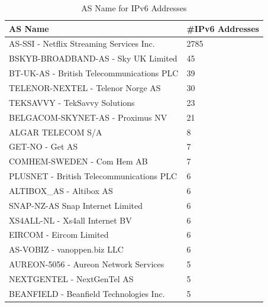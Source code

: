 \begin{table}[!h]
	\centering
	\caption{AS Name for IPv6 Addresses}
	\label{table:asnipv6}
	\begin{tabular}{lp{3cm}}
  		\toprule
  		\textbf{AS Name} & \textbf{\#IPv6 Addresses} \\ 
  		\midrule
		AS-SSI - Netflix Streaming Services Inc.                       &                 2785  \\
		BSKYB-BROADBAND-AS - Sky UK Limited                           &                    45  \\
		BT-UK-AS - British Telecommunications PLC                     &                    39  \\
		TELENOR-NEXTEL - Telenor Norge AS                              &                   30  \\
		TEKSAVVY - TekSavvy Solutions                             &                        23  \\
		BELGACOM-SKYNET-AS - Proximus NV                        &                          21  \\
		ALGAR TELECOM S/A                                       &                           8  \\
		GET-NO - Get AS                                        &                            7  \\
		COMHEM-SWEDEN - Com Hem AB                             &                            7  \\
		PLUSNET - British Telecommunications PLC                  &                         6  \\
		ALTIBOX\_AS - Altibox AS                                &                            6 \\
		SNAP-NZ-AS Snap Internet Limited                         &                          6  \\
		XS4ALL-NL - Xs4all Internet BV                          &                           6  \\
		EIRCOM - Eircom Limited                                 &                           6  \\
		AS-VOBIZ - vanoppen.biz LLC                             &                           6  \\
		AUREON-5056 - Aureon Network Services                   &                           5  \\
		NEXTGENTEL - NextGenTel AS                               &                          5  \\
		BEANFIELD - Beanfield Technologies Inc.                  &                          5  \\

\end{tabular}
\end{table}

